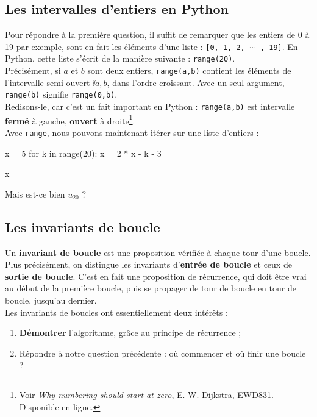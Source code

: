 \subsection{Les intervalles d'entiers en Python}

Pour répondre à la première question, il suffit de remarquer que les entiers de 0 à 19 par exemple, 
sont en fait les éléments d'une liste : \texttt{[0, 1, 2, $\cdots$ , 19]}. En Python, cette liste 
s'écrit de la manière suivante : \texttt{range(20)}.\\
Précisément, si $a$ et $b$ sont deux entiers, \texttt{range(a,b)} contient les éléments de 
l'intervalle semi-ouvert $\ii{a,b}$, dans l'ordre croissant. Avec un seul argument, 
\texttt{range(b)} signifie \texttt{range(0,b)}.\\
Redisons-le, car c'est un fait important en Python : \texttt{range(a,b)} est intervalle 
\textbf{fermé} à gauche, \textbf{ouvert} à
droite\footnote{Voir \textit{Why numbering should start at zero}, E. W. Dijkstra,
  EWD831. Disponible en ligne.}.\\
  
Avec \texttt{range}, nous pouvons maintenant itérer sur une liste d'entiers :

\begin{pyconsole}
x = 5
for k in range(20):
    x = 2 * x - k - 3
  
x
\end{pyconsole}
Mais est-ce bien $u_{20}$ ?

\subsection{Les invariants de boucle}

Un \textbf{invariant de boucle} est une proposition vérifiée à chaque tour d'une boucle. Plus 
précisément, on distingue les invariants d'\textbf{entrée de boucle} et ceux de \textbf{sortie de 
boucle}. C'est en fait une proposition de récurrence, qui doit être vrai au début de la première 
boucle, puis se propager de tour de boucle en tour de boucle, jusqu'au dernier.\\
Les invariants de boucles ont essentiellement deux intérêts :
\begin{enumerate}
 \item \textbf{Démontrer} l'algorithme, grâce au principe de récurrence ;
 \item Répondre à notre question précédente : où commencer et où finir une boucle ?
\end{enumerate}

